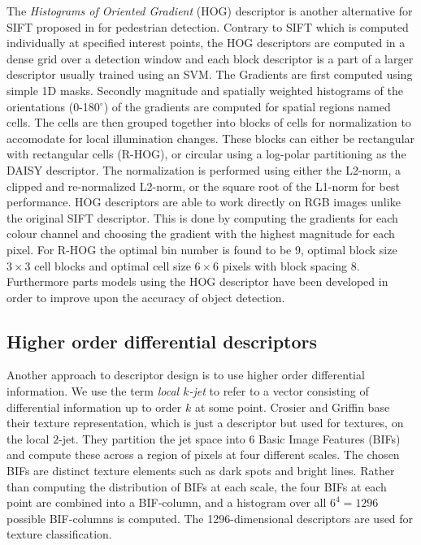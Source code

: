 \documentclass[../thesis.tex]{subfiles}
\begin{document}
The \emph{Histograms of Oriented Gradient} (HOG) descriptor is another
alternative for SIFT proposed in \cite{dalal2005histograms} for pedestrian
detection. Contrary to SIFT which is computed individually at specified
interest points, the HOG descriptors are computed in a dense grid over a
detection window and each block descriptor is a part of a larger descriptor
usually trained using an SVM. The Gradients are first computed using simple
1D masks. Secondly magnitude and spatially weighted histograms of the
orientations (0-180$^{\circ}$) of the gradients are computed for spatial
regions named cells. The cells are
then grouped together into blocks of cells for normalization to accomodate
for local illumination changes. These blocks can either be rectangular with
rectangular cells (R-HOG), or circular using a log-polar partitioning as the
DAISY descriptor. The normalization is performed using either the L2-norm,
a clipped and re-normalized L2-norm, or the square root of the L1-norm for
best performance. HOG descriptors are able to work directly on RGB images
unlike the original SIFT descriptor. This is done by computing the gradients
for each colour channel and choosing the gradient with the highest magnitude
for each pixel. For R-HOG the optimal bin number is found to be 9, optimal
block size $3\times3$ cell blocks and optimal cell size $6\times6$ pixels
with block spacing 8.
Furthermore parts models using the HOG descriptor have been developed
\cite{felzenszwalb2008discriminatively} in order to improve upon the accuracy
of object detection.

\subsection{Higher order differential descriptors}

Another approach to descriptor design is to use higher order differential
information. We use the term \emph{local $k$-jet} to refer to a vector
consisting of differential information up to order $k$ at some point. Crosier
and Griffin \cite{crosier2010using} base their texture representation, which
is just a descriptor but used for textures, on the local $2$-jet. They
partition the jet space into 6 Basic Image Features (BIFs) and compute these
across a region of pixels at four different scales. The chosen BIFs are
distinct texture elements such as dark spots and bright lines. Rather than
computing the distribution of BIFs at each scale, the four BIFs at each point
are combined into a BIF-column, and a histogram over all $6^4 = 1296$ possible
BIF-columns is computed. The 1296-dimensional descriptors are used for texture
classification.
\end{document}
